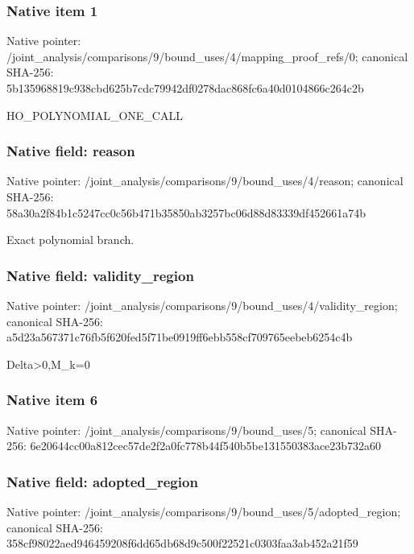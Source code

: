 \documentclass[10pt,a4paper]{article}
\begin{document}
\subsubsection{Native item 1}
Native pointer: /joint\_\allowbreak{}analysis/comparisons/9/bound\_\allowbreak{}uses/4/mapping\_\allowbreak{}proof\_\allowbreak{}refs/0; canonical SHA-256: 5b135968819c938cbd625b7cdc79942df0278dac868fc6a40d0104866c264c2b

\begingroup\raggedright\sloppy HO\_\allowbreak{}POLYNOMIAL\_\allowbreak{}ONE\_\allowbreak{}CALL\par\endgroup

\subsubsection{Native field: reason}
Native pointer: /joint\_\allowbreak{}analysis/comparisons/9/bound\_\allowbreak{}uses/4/reason; canonical SHA-256: 58a30a2f84b1c5247cc0c56b471b35850ab3257bc06d88d83339df452661a74b

\begingroup\raggedright\sloppy Exact polynomial branch.\par\endgroup

\subsubsection{Native field: validity\_\allowbreak{}region}
Native pointer: /joint\_\allowbreak{}analysis/comparisons/9/bound\_\allowbreak{}uses/4/validity\_\allowbreak{}region; canonical SHA-256: a5d23a567371c76fb5f620fed5f71be0919ff6ebb558cf709765eebeb6254c4b

\begingroup\raggedright\sloppy Delta>0,\allowbreak{}M\_\allowbreak{}k=\allowbreak{}0\par\endgroup

\subsubsection{Native item 6}
Native pointer: /joint\_\allowbreak{}analysis/comparisons/9/bound\_\allowbreak{}uses/5; canonical SHA-256: 6e20644cc00a812cec57de2f2a0fc778b44f540b5be131550383ace23b732a60

\subsubsection{Native field: adopted\_\allowbreak{}region}
Native pointer: /joint\_\allowbreak{}analysis/comparisons/9/bound\_\allowbreak{}uses/5/adopted\_\allowbreak{}region; canonical SHA-256: 358cf98022aed946459208f6dd65db68d9c500f22521c0303faa3ab452a21f59
\end{document}
